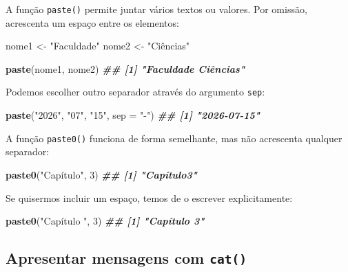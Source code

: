 \documentclass[
  portuguese,
  11pt,
  openany]{book}
\newenvironment{Shaded}{\begin{snugshade}}{\end{snugshade}}
\newcommand{\AttributeTok}[1]{\textcolor[rgb]{0.13,0.29,0.53}{#1}}
\newcommand{\DecValTok}[1]{\textcolor[rgb]{0.00,0.00,0.81}{#1}}
\newcommand{\DocumentationTok}[1]{\textcolor[rgb]{0.56,0.35,0.01}{\textbf{\textit{#1}}}}
\newcommand{\FunctionTok}[1]{\textcolor[rgb]{0.13,0.29,0.53}{\textbf{#1}}}
\newcommand{\NormalTok}[1]{#1}
\newcommand{\OtherTok}[1]{\textcolor[rgb]{0.56,0.35,0.01}{#1}}
\newcommand{\StringTok}[1]{\textcolor[rgb]{0.31,0.60,0.02}{#1}}
\begin{document}
A função \texttt{paste()} permite juntar vários textos ou valores. Por omissão, acrescenta um espaço entre os elementos:

\begin{Shaded}
\begin{Highlighting}[]
\NormalTok{nome1 }\OtherTok{\textless{}{-}} \StringTok{"Faculdade"}
\NormalTok{nome2 }\OtherTok{\textless{}{-}} \StringTok{"Ciências"}

\FunctionTok{paste}\NormalTok{(nome1, nome2)}
\DocumentationTok{\#\# [1] "Faculdade Ciências"}
\end{Highlighting}
\end{Shaded}

Podemos escolher outro separador através do argumento \texttt{sep}:

\begin{Shaded}
\begin{Highlighting}[]
\FunctionTok{paste}\NormalTok{(}\StringTok{"2026"}\NormalTok{, }\StringTok{"07"}\NormalTok{, }\StringTok{"15"}\NormalTok{, }\AttributeTok{sep =} \StringTok{"{-}"}\NormalTok{)}
\DocumentationTok{\#\# [1] "2026{-}07{-}15"}
\end{Highlighting}
\end{Shaded}

A função \texttt{paste0()} funciona de forma semelhante, mas não acrescenta qualquer separador:

\begin{Shaded}
\begin{Highlighting}[]
\FunctionTok{paste0}\NormalTok{(}\StringTok{"Capítulo"}\NormalTok{, }\DecValTok{3}\NormalTok{)}
\DocumentationTok{\#\# [1] "Capítulo3"}
\end{Highlighting}
\end{Shaded}

Se quisermos incluir um espaço, temos de o escrever explicitamente:

\begin{Shaded}
\begin{Highlighting}[]
\FunctionTok{paste0}\NormalTok{(}\StringTok{"Capítulo "}\NormalTok{, }\DecValTok{3}\NormalTok{)}
\DocumentationTok{\#\# [1] "Capítulo 3"}
\end{Highlighting}
\end{Shaded}

\subsection{\texorpdfstring{Apresentar mensagens com \texttt{cat()}}{Apresentar mensagens com cat()}}\label{apresentar-mensagens-com-cat}
\end{document}
